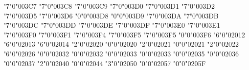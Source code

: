 \let\varphi\upvarphi
\mchardef\upchi"7"0"003C7
\let\chi\upchi
\mchardef\uppsi"7"0"003C8
\let\psi\uppsi
\mchardef\upomega"7"0"003C9
\let\omega\upomega
\mchardef\upvarbeta"7"0"003D0
\mchardef\upvartheta"7"0"003D1
\let\vartheta\upvartheta
\mchardef\upUpsilon"7"0"003D2
\let\Upsilon\upUpsilon
\mchardef\upphi"7"0"003D5
\let\phi\upphi
\mchardef\upvarpi"7"0"003D6
\let\varpi\upvarpi
\mchardef\upoldKoppa"0"0"003D8
\mchardef\upoldkoppa"0"0"003D9
\mchardef\upStigma"7"0"003DA
\mchardef\upstigma"7"0"003DB
\mchardef\upDigamma"7"0"003DC
\mchardef\updigamma"7"0"003DD
\mchardef\upKoppa"7"0"003DE
\mchardef\upkoppa"7"0"003DF
\mchardef\upSampi"7"0"003E0
\mchardef\upsampi"7"0"003E1
\mchardef\upvarkappa"7"0"003F0
\mchardef\upvarrho"7"0"003F1
\let\varrho\upvarrho
\mchardef\upvarTheta"7"0"003F4
\mchardef\upepsilon"7"0"003F5
\let\epsilon\upepsilon
\mchardef\upepsilon"7"0"003F5
\mchardef\upbackepsilon"0"0"003F6
\mchardef\figdash"6"0"02012
\mchardef\endash"6"0"02013
\mchardef\emdash"6"0"02014
\def\Vert{\delim"0"0"02016 }
\def\lq{\delim"4"0"02018 }
\def\rq{\delim"5"0"02019 }
\def\quotsinglbase{\delim"4"0"0201A }
\def\quotsinglright{\delim"5"0"0201B }
\def\quotdblbase{\delim"4"0"0201E }
\def\quotdblright{\delim"5"0"0201F }
\mchardef\dagger"2"0"02020
\mchardef\dagger"0"0"02020
\mchardef\ddagger"2"0"02021
\mchardef\ddagger"0"0"02021
\mchardef\smblkcircle"2"0"02022
\mchardef\emleader"6"0"02026
\mchardef\prime"0"0"02032
\let\arcmin\prime
\mchardef\prime"0"0"02032
\mchardef\arcsec"0"0"02033
\mchardef\dprime"0"0"02033
\def\trprime{\delim"4"0"02034 }
\mchardef\backprime"0"0"02035
\mchardef\backdprime"0"0"02036
\mchardef\backtrprime"0"0"02037
\def\guilsinglleft{\delim"4"0"02039 }
\def\guilsinglright{\delim"5"0"0203A }
\mchardef\tieconcat"2"0"02040
\mchardef\fracslash"0"0"02044
\mchardef\closure"3"0"02050
\mchardef\qprime"0"0"02057
\mchardef\medmathspace"0"0"0205F
\def\leftharpoonaccent{\maccent"7"0"020D0 }
\def\wideleftharpoonaccent{\maccent"7"0"020D0 }
\def\rightharpoonaccent{\maccent"7"0"020D1 }
\let\harp\rightharpoonaccent
\def\widerightharpoonaccent{\maccent"7"0"020D1 }
\def\vertoverlay{\maccent"7"0"020D2 }
\def\overleftarrow{\maccent"7"0"020D6 }
\def\wideoverleftarrow{\maccent"7"0"020D6 }
\def\vec{\maccent"7"0"020D7 }
\def\wideoverrightarrow{\maccent"7"0"020D7 }
\def\dddot{\maccent"7"0"020DB }
\def\ddddot{\maccent"7"0"020DC }
\def\overleftrightarrow{\maccent"7"0"020E1 }
\let\lrvec\overleftrightarrow
\def\annuity{\maccent"7"0"020E7 }
\def\threeunderdot{\maccent"7"0"020E8 }
\def\widebridgeabove{\maccent"7"0"020E9 }
\def\overrightharpoondown{\maccent"7"0"020EC }
\def\overleftharpoondown{\maccent"7"0"020ED }
